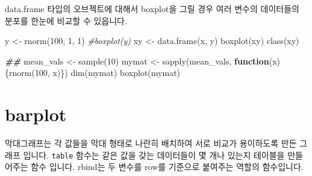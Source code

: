 \documentclass[
]{book}
\newenvironment{Shaded}{\begin{snugshade}}{\end{snugshade}}
\newcommand{\CommentTok}[1]{\textcolor[rgb]{0.56,0.35,0.01}{\textit{#1}}}
\newcommand{\ControlFlowTok}[1]{\textcolor[rgb]{0.13,0.29,0.53}{\textbf{#1}}}
\newcommand{\DecValTok}[1]{\textcolor[rgb]{0.00,0.00,0.81}{#1}}
\newcommand{\DocumentationTok}[1]{\textcolor[rgb]{0.56,0.35,0.01}{\textbf{\textit{#1}}}}
\newcommand{\FunctionTok}[1]{\textcolor[rgb]{0.00,0.00,0.00}{#1}}
\newcommand{\NormalTok}[1]{#1}
\newcommand{\OtherTok}[1]{\textcolor[rgb]{0.56,0.35,0.01}{#1}}
\begin{document}
data.frame 타입의 오브젝트에 대해서 boxplot을 그릴 경우 여러 변수의 데이터들의 분포를 한눈에 비교할 수 있읍니다.

\begin{Shaded}
\begin{Highlighting}[]
\NormalTok{y }\OtherTok{\textless{}{-}} \FunctionTok{rnorm}\NormalTok{(}\DecValTok{100}\NormalTok{, }\DecValTok{1}\NormalTok{, }\DecValTok{1}\NormalTok{)}
\CommentTok{\#boxplot(y)}
\NormalTok{xy }\OtherTok{\textless{}{-}} \FunctionTok{data.frame}\NormalTok{(x, y)}
\FunctionTok{boxplot}\NormalTok{(xy)}
\FunctionTok{class}\NormalTok{(xy)}

\DocumentationTok{\#\#}
\NormalTok{mean\_vals }\OtherTok{\textless{}{-}} \FunctionTok{sample}\NormalTok{(}\DecValTok{10}\NormalTok{)}
\NormalTok{mymat }\OtherTok{\textless{}{-}} \FunctionTok{sapply}\NormalTok{(mean\_vals, }\ControlFlowTok{function}\NormalTok{(x)\{}\FunctionTok{rnorm}\NormalTok{(}\DecValTok{100}\NormalTok{, x)\})}
\FunctionTok{dim}\NormalTok{(mymat)}
\FunctionTok{boxplot}\NormalTok{(mymat)}
\end{Highlighting}
\end{Shaded}

\hypertarget{barplot}{%
\section{barplot}\label{barplot}}

막대그래프는 각 값들을 막대 형태로 나란히 배치하여 서로 비교가 용이하도록 만든 그래프 입니다. \texttt{table} 함수는 같은 값을 갖는 데이터들이 몇 개나 있는지 테이블을 만들어주는 함수 입니다. rbind는 두 변수를 row를 기준으로 붙여주는 역할의 함수입니다.
\end{document}
